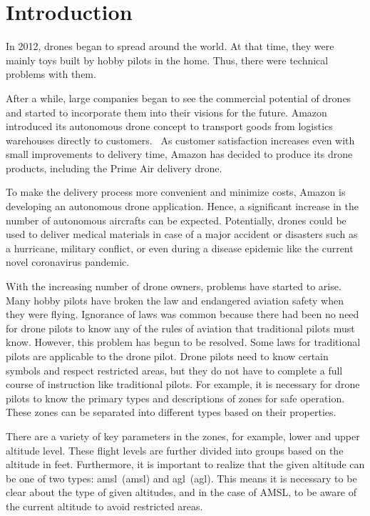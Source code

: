 \chapter{Introduction}\label{ch:introduction}
In 2012, drones began to spread around the world.
At that time, they were mainly toys built by hobby pilots in the home.
Thus, there were technical problems with them.

After a while, large companies began to see the commercial potential of drones and started to incorporate them into their visions for the future.
Amazon introduced its autonomous drone concept to transport goods from logistics warehouses directly to customers.~\cite{amazonArticle}
As customer satisfaction increases even with small improvements to delivery time, Amazon has decided to produce its drone products, including the Prime Air delivery drone.

To make the delivery process more convenient and minimize costs, Amazon is developing an autonomous drone application.
Hence, a significant increase in the number of autonomous aircrafts can be expected.
Potentially, drones could be used to deliver medical materials in case of a major accident or disasters such as a hurricane, military conflict, or even during a disease epidemic like the current novel coronavirus pandemic.

With the increasing number of drone owners, problems have started to arise.
Many hobby pilots have broken the law and endangered aviation safety when they were flying.
Ignorance of laws was common because there had been no need for drone pilots to know any of the rules of aviation that traditional pilots must know.
However, this problem has begun to be resolved.
Some laws for traditional pilots are applicable to the drone pilot.
Drone pilots need to know certain symbols and respect restricted areas, but they do not have to complete a full course of instruction like traditional pilots.
For example, it is necessary for drone pilots to know the primary types and descriptions of zones for safe operation.
These zones can be separated into different types based on their properties.

There are a variety of key parameters in the zones, for example, lower and upper altitude level.
These flight levels are further divided into groups based on the altitude in feet.
Furthermore, it is important to realize that the given altitude can be one of two types: \acrshort{amsl}~(\acrlong{amsl}) and \acrshort{agl}~(\acrlong{agl}).
This means it is necessary to be clear about the type of given altitudes, and in the case of AMSL, to be aware of the current altitude to avoid restricted areas.


